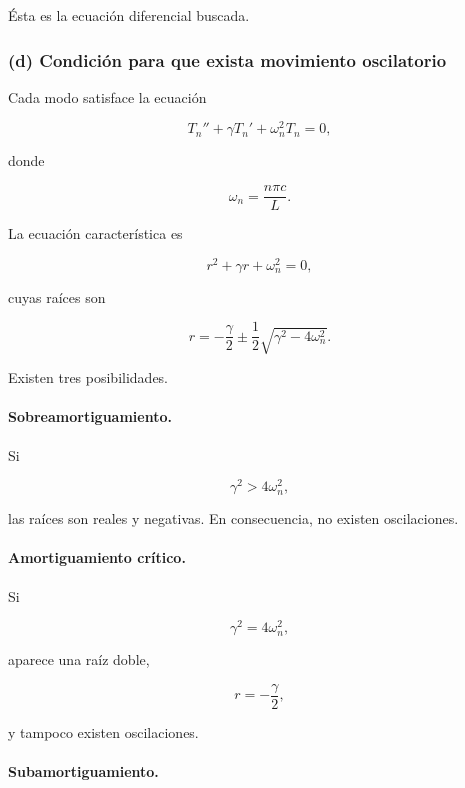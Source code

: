 \documentclass[12pt]{article}
\begin{document}
Ésta es la ecuación diferencial buscada.

\subsubsection*{(d) Condición para que exista movimiento oscilatorio}

Cada modo satisface la ecuación

\begin{equation}
T_n''+\gamma T_n'
+\omega_n^2T_n=0,
\end{equation}

donde

\begin{equation}
\omega_n=\frac{n\pi c}{L}.
\end{equation}

La ecuación característica es

\begin{equation}
r^2+\gamma r+\omega_n^2=0,
\end{equation}

cuyas raíces son

\begin{equation}
r=
-\frac{\gamma}{2}
\pm
\frac12
\sqrt{\gamma^2-4\omega_n^2}.
\end{equation}

Existen tres posibilidades.

\paragraph{Sobreamortiguamiento.}

Si

\[
\gamma^2>4\omega_n^2,
\]

las raíces son reales y negativas. En consecuencia, no existen oscilaciones.

\paragraph{Amortiguamiento crítico.}

Si

\[
\gamma^2=4\omega_n^2,
\]

aparece una raíz doble,

\[
r=-\frac{\gamma}{2},
\]

y tampoco existen oscilaciones.

\paragraph{Subamortiguamiento.}
\end{document}
